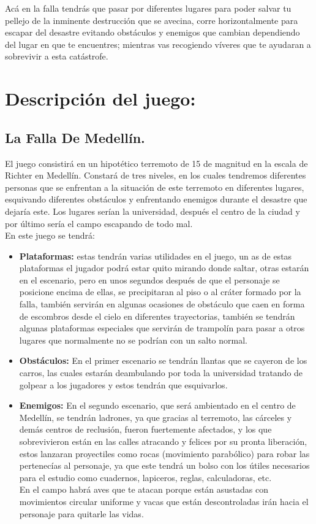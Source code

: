 \documentclass{article}
\begin{document}
Acá en la falla tendrás que pasar por diferentes lugares para poder salvar tu pellejo de la inminente destrucción que se avecina, corre horizontalmente para escapar del desastre evitando obstáculos y enemigos que cambian dependiendo del lugar en que te encuentres; mientras vas recogiendo víveres que te ayudaran a sobrevivir a esta catástrofe.


\section{Descripción del juego:}\label{descripcion}

\subsection{La Falla De Medellín.}

El juego consistirá en un hipotético terremoto de 15 de magnitud en la escala de Richter en Medellín. Constará de tres niveles, en los cuales tendremos diferentes personas que se enfrentan a la situación de este terremoto en diferentes lugares, esquivando diferentes obstáculos y enfrentando enemigos durante el desastre que dejaría este. Los lugares serían la universidad, después el centro de la ciudad y por último sería el campo escapando de todo mal.\\

En este juego se tendrá:

\begin{itemize}
    \item \textbf{Plataformas:} estas tendrán varias utilidades en el juego, un as de estas plataformas el jugador podrá estar quito mirando donde saltar, otras estarán en el escenario, pero en unos segundos después de que el personaje se posicione encima de ellas, se precipitaran al piso o al cráter formado por la falla, también servirán en algunas ocasiones de obstáculo que caen en forma de escombros desde el cielo en diferentes trayectorias, también se tendrán algunas plataformas especiales que servirán de trampolín para pasar a otros lugares que normalmente no se podrían con un salto normal.
    \item \textbf{Obstáculos:} En el primer escenario se tendrán llantas que se cayeron de los carros, las cuales estarán deambulando por toda la universidad tratando de golpear a los jugadores y estos tendrán que esquivarlos.
    \item \textbf{Enemigos:} En el segundo escenario, que será ambientado en el centro de Medellín, se tendrán ladrones, ya que gracias al terremoto, las cárceles y demás centros de reclusión, fueron fuertemente afectados, y los que sobrevivieron están en las calles atracando y felices por su pronta liberación, estos lanzaran proyectiles como rocas (movimiento parabólico) para robar las pertenecías al personaje, ya que este tendrá un bolso con los útiles necesarios para el estudio como cuadernos, lapiceros, reglas, calculadoras, etc.\\
    En el campo habrá aves que te atacan porque están asustadas con movimientos circular uniforme y vacas que están descontroladas irán hacia el personaje para quitarle las vidas.
\end{itemize}
\end{document}
